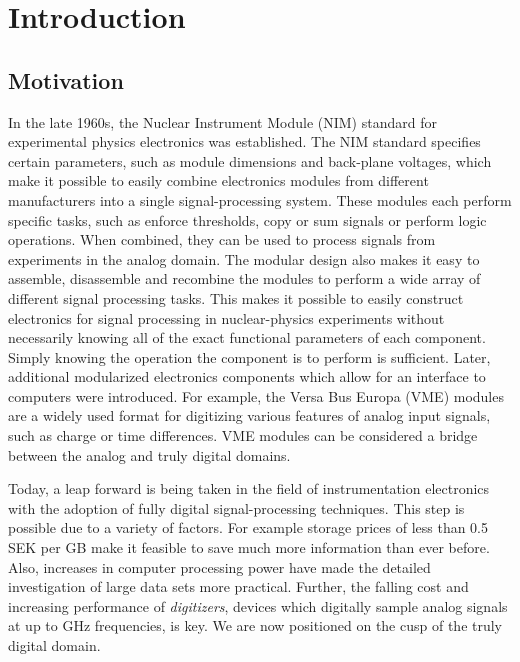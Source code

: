 \documentclass[main.tex]{subfiles}
\begin{document}
\chapter{Introduction}\label{ch:1}
\section{Motivation}
In the late 1960s, the Nuclear Instrument Module (NIM) standard for experimental physics electronics was established. The NIM standard specifies certain parameters, such as module dimensions and back-plane voltages, which make it possible to easily combine electronics modules from different manufacturers into a single signal-processing system. These modules each perform specific tasks, such as enforce thresholds, copy or sum signals or perform logic operations. When combined, they can be used to process signals from experiments in the analog domain. The modular design also makes it easy to assemble, disassemble and recombine the modules to perform a wide array of different signal processing tasks. 
This makes it possible to easily construct electronics for signal processing in nuclear-physics experiments without necessarily knowing all of the exact functional parameters of each component. Simply knowing the operation the component is to perform is sufficient. Later, additional modularized electronics components which allow for an interface to computers were introduced. For example, the Versa Bus Europa (VME) modules are a widely used format for digitizing various features of analog input signals, such as charge or time differences. VME modules can be considered a bridge between the analog and truly digital domains.

Today, a leap forward is being taken in the field of instrumentation electronics with the adoption of fully digital signal-processing techniques. This step is possible due to a variety of factors. For example storage prices of less than 0.5 SEK per GB make it feasible to save much more information than ever before. Also, increases in computer processing power have made the detailed investigation of large data sets more practical. Further, the falling cost and increasing performance of \textit{digitizers}, devices which digitally sample analog signals at up to GHz frequencies, is key. We are now positioned on the cusp of the truly digital domain.
\end{document}
